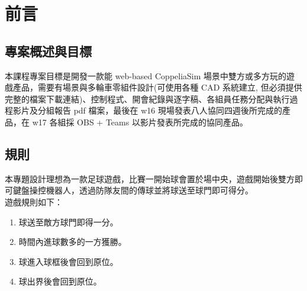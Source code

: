 \chapter{前言}
\renewcommand{\baselinestretch}{10.0} %
\setcounter{page}{1}  %
\fontsize{14pt}{2.5pt}\sectionef
\section{專案概述與目標}
本課程專案目標是開發一款能 web-based CoppeliaSim 場景中雙方或多方玩的遊戲產品，需要有場景與多輪車零組件設計(可使用各種 CAD 系統建立, 但必須提供完整的檔案下載連結)、控制程式、開會紀錄與逐字稿、各組員任務分配與執行過程影片及分組報告 pdf 檔案，最後在 w16 現場發表八人協同四週後所完成的產品，在 w17 各組採 OBS + Teams 以影片發表所完成的協同產品。
\section{規則}
本專題設計理想為一款足球遊戲，比賽一開始球會置於場中央，遊戲開始後雙方即
可鍵盤操控機器人，透過防隊友間的傳球並將球送至球門即可得分。\\
遊戲規則如下：\\
\begin{enumerate}
\item 球送至敵方球門即得一分。\\
\item 時間內進球數多的一方獲勝。\\
\item 球進入球框後會回到原位。\\
\item 球出界後會回到原位。\\
\end{enumerate}
\renewcommand{\baselinestretch}{0.5} %